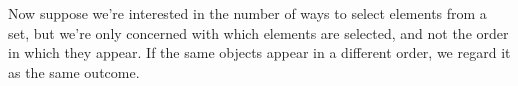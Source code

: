 



Now suppose we're interested in the number of ways to select elements from a set, but we're only concerned with which elements are selected, and not the order in which they appear. If the same objects appear in a different order, we regard it as the same outcome.

